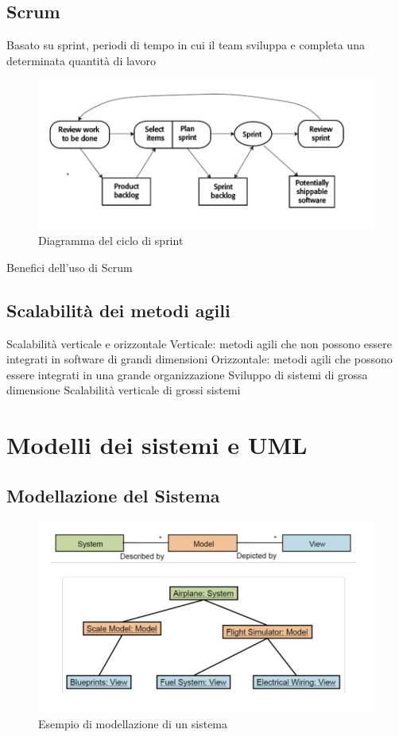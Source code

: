 \documentclass{article}
\begin{document}
	\subsection{Scrum}
	Basato su sprint, periodi di tempo in cui il team sviluppa e completa una determinata quantità di lavoro
	\begin{figure}[h]
		\centering
		\includegraphics[scale=0.3]{21.diag_sprint.png}
		\caption{Diagramma del ciclo di sprint}
		\label{fig:im-21}
	\end{figure}
	Benefici dell’uso di Scrum
	\subsection{Scalabilità dei metodi agili}
	Scalabilità verticale e orizzontale
	Verticale: metodi agili che non possono essere integrati in software di grandi dimensioni
	Orizzontale: metodi agili che possono essere integrati in una grande organizzazione
	Sviluppo di sistemi di grossa dimensione
	Scalabilità verticale di grossi sistemi
	
	\section{Modelli dei sistemi e UML}
	\subsection{Modellazione del Sistema}
	\begin{figure}[h]
		\centering
		\includegraphics[scale=0.4]{22.mod_sis.png}
		\caption{Esempio di modellazione di un sistema}
		\label{fig:im-22}
	\end{figure}
\end{document}
